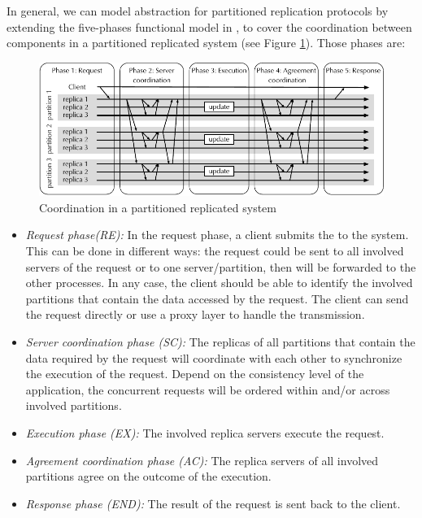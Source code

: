 In general, we can model abstraction for partitioned replication protocols by
extending the five-phases functional model in \cite{pedone:replication}, to
cover the coordination between components in a partitioned replicated system
(see Figure \ref{fig:replication:coordination}). Those phases are:


\begin{figure}[ht!]
  \begin{minipage}[b]{1.0\linewidth}
  \centering
        \includegraphics[width=1\linewidth]{figures/replication-coordination}
  \end{minipage}
  \caption{Coordination in a partitioned replicated system}
  \label{fig:replication:coordination}
\end{figure}

\begin{itemize}
  \item \textit{Request phase(RE):} In the request phase, a client submits the
     to the system. This can be done in different ways: the request could
  be sent to all involved servers of the request or to one server/partition,
  then will be forwarded to the other processes. In any case, the client should
  be able to identify the involved partitions that contain the data accessed by
  the request. The client can send the request directly or use a proxy layer to
  handle the transmission.
  \item \textit{Server coordination phase (SC):} The replicas of all partitions
  that contain the data required by the request will coordinate with each other
  to synchronize the execution of the request. Depend on the consistency level
  of the application, the concurrent requests will be ordered within and/or across
  involved partitions.
  \item \textit{Execution phase (EX):} The involved replica servers execute the request.
  \item \textit{Agreement coordination phase (AC):} The replica servers of all involved
  partitions agree on the outcome of the execution.
  \item \textit{Response phase (END):} The result of the request is sent back to the client.
\end{itemize}

